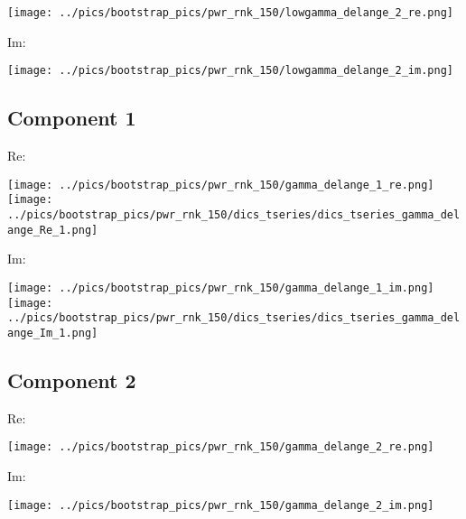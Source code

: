 \documentclass{article}
\begin{document}
\hspace{2cm}
\texttt{[image: ../pics/bootstrap\_pics/pwr\_rnk\_150/lowgamma\_delange\_2\_re.png]}

Im:

\hspace{2cm}
\texttt{[image: ../pics/bootstrap\_pics/pwr\_rnk\_150/lowgamma\_delange\_2\_im.png]}

\subsection*{Component 1}
Re:

\hspace{2cm}
\texttt{[image: ../pics/bootstrap\_pics/pwr\_rnk\_150/gamma\_delange\_1\_re.png]}
\hspace{2cm}
\texttt{[image: ../pics/bootstrap\_pics/pwr\_rnk\_150/dics\_tseries/dics\_tseries\_gamma\_delange\_Re\_1.png]}

Im:

\hspace{2cm}
\texttt{[image: ../pics/bootstrap\_pics/pwr\_rnk\_150/gamma\_delange\_1\_im.png]}
\hspace{2cm}
\texttt{[image: ../pics/bootstrap\_pics/pwr\_rnk\_150/dics\_tseries/dics\_tseries\_gamma\_delange\_Im\_1.png]}

\subsection*{Component 2}
Re:

\hspace{2cm}
\texttt{[image: ../pics/bootstrap\_pics/pwr\_rnk\_150/gamma\_delange\_2\_re.png]}

Im:

\hspace{2cm}
\texttt{[image: ../pics/bootstrap\_pics/pwr\_rnk\_150/gamma\_delange\_2\_im.png]}

\end{document}
